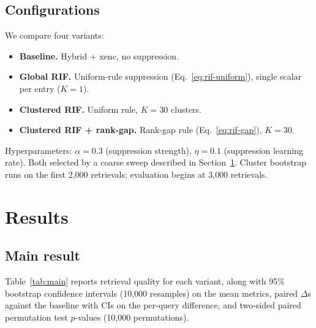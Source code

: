\documentclass[11pt,a4paper]{article}
\begin{document}
\subsection{Configurations}

We compare four variants:
\begin{itemize}
  \item \textbf{Baseline.} Hybrid + xenc, no suppression.
  \item \textbf{Global RIF.} Uniform-rule suppression (Eq.~\ref{eq:rif-uniform}), single scalar per entry ($K=1$).
  \item \textbf{Clustered RIF.} Uniform rule, $K=30$ clusters.
  \item \textbf{Clustered RIF + rank-gap.} Rank-gap rule (Eq.~\ref{eq:rif-gap}), $K=30$.
\end{itemize}

Hyperparameters: $\alpha = 0.3$ (suppression strength), $\eta = 0.1$ (suppression learning rate). Both selected by a coarse sweep described in Section~\ref{sec:results}. Cluster bootstrap runs on the first 2{,}000 retrievals; evaluation begins at 3{,}000 retrievals.

\section{Results}
\label{sec:results}

\subsection{Main result}

Table~\ref{tab:main} reports retrieval quality for each variant, along with 95\% bootstrap confidence intervals (10{,}000 resamples) on the mean metrics, paired $\Delta$s against the baseline with CIs on the per-query difference, and two-sided paired permutation test $p$-values (10{,}000 permutations).
\end{document}
